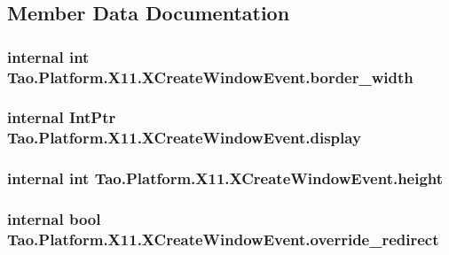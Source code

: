 \subsection{Member Data Documentation}
\hypertarget{struct_tao_1_1_platform_1_1_x11_1_1_x_create_window_event_a5bcfbdd776c614a25facda426ff5c275}{
\subsubsection[{border\_\-width}]{\setlength{\rightskip}{0pt plus 5cm}internal int {\bf Tao.Platform.X11.XCreateWindowEvent.border\_\-width}}}
\label{struct_tao_1_1_platform_1_1_x11_1_1_x_create_window_event_a5bcfbdd776c614a25facda426ff5c275}
\hypertarget{struct_tao_1_1_platform_1_1_x11_1_1_x_create_window_event_ac25a67459791e961e1ff906835dbcea1}{
\subsubsection[{display}]{\setlength{\rightskip}{0pt plus 5cm}internal IntPtr {\bf Tao.Platform.X11.XCreateWindowEvent.display}}}
\label{struct_tao_1_1_platform_1_1_x11_1_1_x_create_window_event_ac25a67459791e961e1ff906835dbcea1}
\hypertarget{struct_tao_1_1_platform_1_1_x11_1_1_x_create_window_event_ae056f03fc62746bb3e04097237632e52}{
\subsubsection[{height}]{\setlength{\rightskip}{0pt plus 5cm}internal int {\bf Tao.Platform.X11.XCreateWindowEvent.height}}}
\label{struct_tao_1_1_platform_1_1_x11_1_1_x_create_window_event_ae056f03fc62746bb3e04097237632e52}
\hypertarget{struct_tao_1_1_platform_1_1_x11_1_1_x_create_window_event_a8f1a5a273675fee615d71ebfc28323be}{
\subsubsection[{override\_\-redirect}]{\setlength{\rightskip}{0pt plus 5cm}internal bool {\bf Tao.Platform.X11.XCreateWindowEvent.override\_\-redirect}}}
